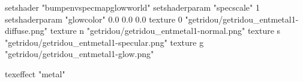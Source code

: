 setshader "bumpenvspecmapglowworld"
setshaderparam "specscale" 1
setshaderparam "glowcolor" 0.0 0.0 0.0
texture 0 "getridou/getridou_entmetal1-diffuse.png"
texture n "getridou/getridou_entmetal1-normal.png"
texture s "getridou/getridou_entmetal1-specular.png"
texture g "getridou/getridou_entmetal1-glow.png"

texeffect "metal"
